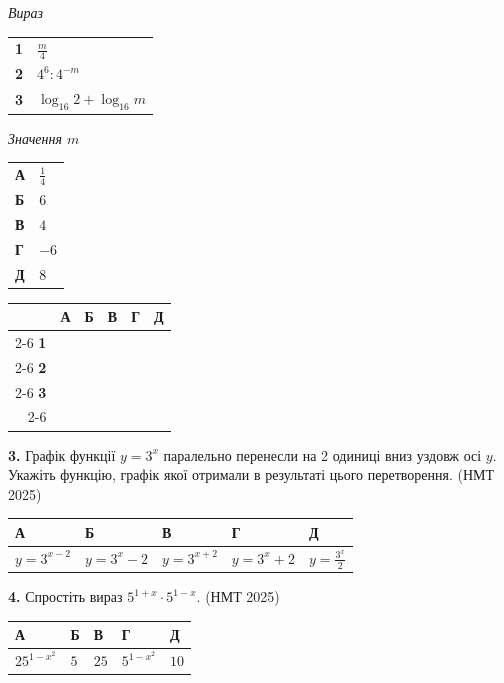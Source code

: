 \documentclass[14pt]{extarticle}
\newcommand{\answerGrid}{
    \begingroup
    \setlength{\tabcolsep}{4pt}
    \renewcommand{\arraystretch}{1.2}
    \small
    \begin{tabular}{r|c|c|c|c|c|}
         \multicolumn{1}{c}{} & \multicolumn{1}{c}{\textbf{А}} & \multicolumn{1}{c}{\textbf{Б}} & \multicolumn{1}{c}{\textbf{В}} & \multicolumn{1}{c}{\textbf{Г}} & \multicolumn{1}{c}{\textbf{Д}} \\ \cline{2-6}
         \textbf{1} & & & & & \\ \cline{2-6}
         \textbf{2} & & & & & \\ \cline{2-6}
         \textbf{3} & & & & & \\ \cline{2-6}
    \end{tabular}
    \endgroup
}
\newcommand{\answerTable}[5]{
\begin{center}
\begin{tabular}{|*{5}{>{\centering\arraybackslash}m{2.8cm}|}}
\hline
\rule[-0.3cm]{0pt}{0.8cm}\textbf{А} & \textbf{Б} & \textbf{В} & \textbf{Г} & \textbf{Д} \\
\hline
\rule[-0.4cm]{0pt}{1.0cm}#1 & \rule[-0.4cm]{0pt}{1.0cm}#2 & \rule[-0.4cm]{0pt}{1.0cm}#3 & \rule[-0.4cm]{0pt}{1.0cm}#4 & \rule[-0.4cm]{0pt}{1.0cm}#5 \\
\hline
\end{tabular}
\end{center}
}
\newcommand{\nmtyear}[1]{\hfill{\small\color{yearcolor}(НМТ #1)}}
\begin{document}
\noindent
\begin{minipage}[t]{0.35\textwidth}
    \textit{Вираз} \par \vspace{0.2cm}
    \begin{tabular}{@{}p{0.5cm} l@{}}
    \textbf{1} & $\displaystyle\frac{m}{4}$ \\[0.5cm]
    \textbf{2} & \colorbox{yellow!30}{$4^6 : 4^{-m}$} \\[0.4cm]
    \textbf{3} & $\log_{16} 2 + \log_{16} m$ \\
    \end{tabular}
\end{minipage}%
\hfill
\begin{minipage}[t]{0.35\textwidth}
    \textit{Значення $m$} \par \vspace{0.2cm}
    \begin{tabular}{@{}p{0.5cm} l@{}}
    \textbf{А} & $\displaystyle\frac{1}{4}$ \\[0.4cm]
    \textbf{Б} & $6$ \\[0.2cm]
    \textbf{В} & $4$ \\[0.2cm]
    \textbf{Г} & $-6$ \\[0.2cm]
    \textbf{Д} & $8$ \\
    \end{tabular}
\end{minipage}%
\hfill
\begin{minipage}[t]{0.25\textwidth}
    \raggedleft
    \answerGrid
\end{minipage}
\vspace{0.7cm}

\noindent\textbf{3.} Графік функції \colorbox{yellow!30}{$y = 3^x$} паралельно перенесли на 2 одиниці вниз уздовж осі $y$. Укажіть функцію, графік якої отримали в результаті цього перетворення. \nmtyear{2025}
\vspace{0.3cm}

\answerTable{$y = 3^{x-2}$}{$y = 3^x - 2$}{$y = 3^{x+2}$}{$y = 3^x + 2$}{$y = \displaystyle\frac{3^x}{2}$}
\vspace{0.5cm}

\noindent\textbf{4.} Спростіть вираз \colorbox{yellow!30}{$5^{1+x} \cdot 5^{1-x}$}. \nmtyear{2025}
\vspace{0.3cm}

\answerTable{$25^{1-x^2}$}{$5$}{$25$}{$5^{1-x^2}$}{$10$}
\vspace{0.5cm}
\end{document}
